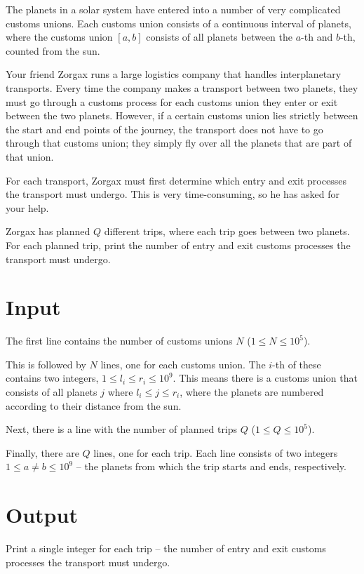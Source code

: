 \noindent
The planets in a solar system have entered into a number of very complicated customs unions.
Each customs union consists of a continuous interval of planets, where the customs union $[a, b]$ consists of all planets between the $a$-th and $b$-th, counted from the sun.

Your friend Zorgax runs a large logistics company that handles interplanetary transports.
Every time the company makes a transport between two planets, they must go through a customs process for each customs union they enter or exit between the two planets.
However, if a certain customs union lies strictly between the start and end points of the journey, the transport does not have to go through that customs union; they simply fly over all the planets that are part of that union.

For each transport, Zorgax must first determine which entry and exit processes the transport must undergo.
This is very time-consuming, so he has asked for your help.

Zorgax has planned $Q$ different trips, where each trip goes between two planets.
For each planned trip, print the number of entry and exit customs processes the transport must undergo.

\section*{Input}
The first line contains the number of customs unions $N$ ($1 \le N \le 10^5$).

This is followed by $N$ lines, one for each customs union.
The $i$-th of these contains two integers, $1 \le l_i \leq r_i \le 10^9$.
This means there is a customs union that consists of all planets $j$ where $l_i \leq j \leq r_i$, where the planets are numbered according to their distance from the sun.

Next, there is a line with the number of planned trips $Q$ ($1 \le Q \le 10^5$).

Finally, there are $Q$ lines, one for each trip.
Each line consists of two integers $1 \le a \neq b \le 10^9$ -- the planets from which the trip starts and ends, respectively.

\section*{Output}
Print a single integer for each trip -- the number of entry and exit customs processes the transport must undergo.

